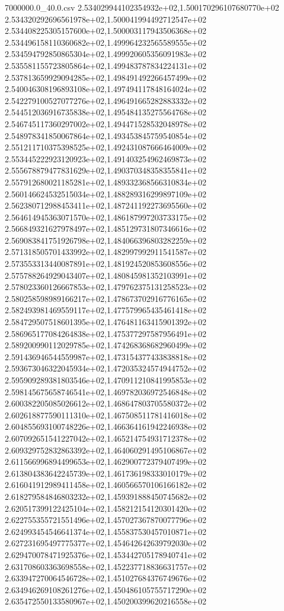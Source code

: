 \begin{filecontents*}{7000000.0_40.0.csv}
2.534029944102354932e+02,1.500170296107680770e+02
2.534320292696561978e+02,1.500041994492712547e+02
2.534408225305157600e+02,1.500003117943506368e+02
2.534496158110360682e+02,1.499964232565589555e+02
2.534594792850865304e+02,1.499920605356091983e+02
2.535581155723805864e+02,1.499483787834224131e+02
2.537813659929094285e+02,1.498491492266457499e+02
2.540046308196893108e+02,1.497494117848164024e+02
2.542279100527077276e+02,1.496491665282883332e+02
2.544512036916735838e+02,1.495484135275564768e+02
2.546745117360297002e+02,1.494471528532048978e+02
2.548978341850067864e+02,1.493453845759540854e+02
2.551211710375398525e+02,1.492431087666464009e+02
2.553445222923120923e+02,1.491403254962469873e+02
2.555678879477831629e+02,1.490370348358355841e+02
2.557912680021185281e+02,1.489332368566310834e+02
2.560146624532515034e+02,1.488289316299897109e+02
2.562380712988453411e+02,1.487241192273695560e+02
2.564614945363071570e+02,1.486187997203733175e+02
2.566849321627978497e+02,1.485129731807346616e+02
2.569083841751926798e+02,1.484066396803282259e+02
2.571318505701433992e+02,1.482997992911541587e+02
2.573553313440087891e+02,1.481924520853608556e+02
2.575788264929043407e+02,1.480845981352103991e+02
2.578023360126667853e+02,1.479762375131258523e+02
2.580258598989166217e+02,1.478673702916776165e+02
2.582493981469559117e+02,1.477579965435461418e+02
2.584729507518601395e+02,1.476481163415901392e+02
2.586965177084264838e+02,1.475377297587956491e+02
2.589200990112029785e+02,1.474268368682960499e+02
2.591436946544559987e+02,1.473154377433838818e+02
2.593673046322045934e+02,1.472035324574944752e+02
2.595909289381803546e+02,1.470911210841995853e+02
2.598145675658746541e+02,1.469782036972546848e+02
2.600382205085026612e+02,1.468647803705580372e+02
2.602618877590111310e+02,1.467508511781416018e+02
2.604855693100748226e+02,1.466364161942246938e+02
2.607092651541227042e+02,1.465214754931712378e+02
2.609329752832863392e+02,1.464060291495106867e+02
2.611566996894499653e+02,1.462900772379407499e+02
2.613804383642245739e+02,1.461736198333010179e+02
2.616041912989411458e+02,1.460566570106166182e+02
2.618279584846803232e+02,1.459391888450745682e+02
2.620517399122425104e+02,1.458212154120301420e+02
2.622755355721551496e+02,1.457027367870077796e+02
2.624993454546641374e+02,1.455837530457010871e+02
2.627231695497775377e+02,1.454642642639792030e+02
2.629470078471925376e+02,1.453442705178940741e+02
2.631708603363698558e+02,1.452237718836631757e+02
2.633947270064546728e+02,1.451027684376749676e+02
2.634946269108261276e+02,1.450486105755717290e+02
2.635472550133580967e+02,1.450200399620216558e+02

\end{filecontents*}
